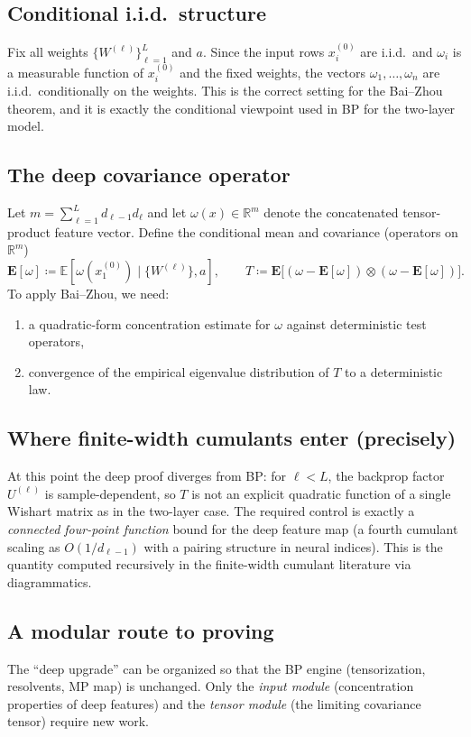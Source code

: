 \documentclass[11pt]{article}
\newcommand{\RR}{\mathbb{R}}
\newcommand{\EE}{\mathbb{E}}
\begin{document}
\subsection{Conditional i.i.d.\ structure}
Fix all weights $\{W^{(\ell)}\}_{\ell=1}^L$ and $a$.
Since the input rows $x_i^{(0)}$ are i.i.d.\ and $\omega_i$ is a measurable function of $x_i^{(0)}$ and the fixed weights, the vectors $\omega_1,\dots,\omega_n$ are i.i.d.\ conditionally on the weights.
This is the correct setting for the Bai--Zhou theorem, and it is exactly the conditional viewpoint used in BP for the two-layer model.

\subsection{The deep covariance operator}
Let $m=\sum_{\ell=1}^L d_{\ell-1}d_\ell$ and let $\omega(x)\in\RR^{m}$ denote the concatenated tensor-product feature vector.
Define the conditional mean and covariance (operators on $\RR^m$)
\[
  \mathbf{E}[\omega]\coloneqq \EE[\omega(x_1^{(0)})\mid \{W^{(\ell)}\},a],
  \qquad
  T\coloneqq \mathbf{E}\bigl[(\omega-\mathbf{E}[\omega])\otimes (\omega-\mathbf{E}[\omega])\bigr].
\]
To apply Bai--Zhou, we need:
\begin{enumerate}
  \item a quadratic-form concentration estimate for $\omega$ against deterministic test operators,
  \item convergence of the empirical eigenvalue distribution of $T$ to a deterministic law.
\end{enumerate}

\subsection{Where finite-width cumulants enter (precisely)}
At this point the deep proof diverges from BP: for $\ell<L$, the backprop factor $U^{(\ell)}$ is sample-dependent, so $T$ is not an explicit quadratic function of a single Wishart matrix as in the two-layer case.
The required control is exactly a \emph{connected four-point function} bound for the deep feature map (a fourth cumulant scaling as $O(1/d_{\ell-1})$ with a pairing structure in neural indices).
This is the quantity computed recursively in the finite-width cumulant literature via diagrammatics.

\subsection{A modular route to proving }
\label{subsec:deep-gep-modular}
The ``deep upgrade'' can be organized so that the BP engine (tensorization, resolvents, MP map) is unchanged.
Only the \emph{input module} (concentration properties of deep features) and the \emph{tensor module} (the limiting covariance tensor) require new work.
\end{document}
